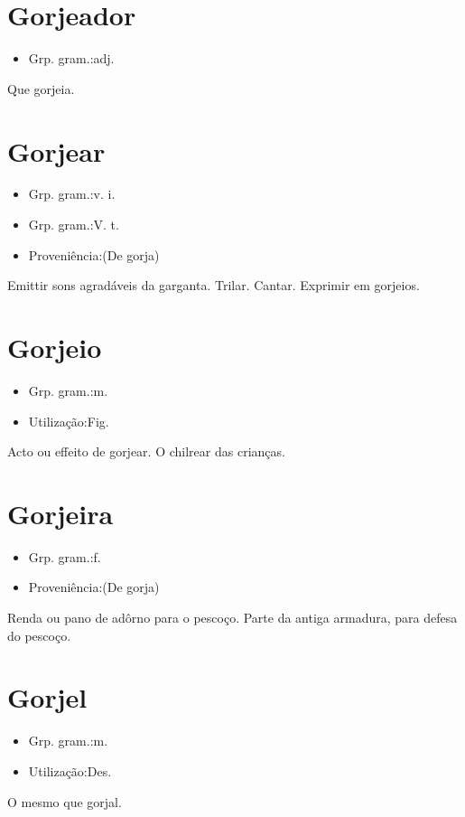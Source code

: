 \section{Gorjeador}
\begin{itemize}
\item {Grp. gram.:adj.}
\end{itemize}
Que gorjeia.
\section{Gorjear}
\begin{itemize}
\item {Grp. gram.:v. i.}
\end{itemize}
\begin{itemize}
\item {Grp. gram.:V. t.}
\end{itemize}
\begin{itemize}
\item {Proveniência:(De \textunderscore gorja\textunderscore )}
\end{itemize}
Emittir sons agradáveis da garganta.
Trilar.
Cantar.
Exprimir em gorjeios.
\section{Gorjeio}
\begin{itemize}
\item {Grp. gram.:m.}
\end{itemize}
\begin{itemize}
\item {Utilização:Fig.}
\end{itemize}
Acto ou effeito de gorjear.
O chilrear das crianças.
\section{Gorjeira}
\begin{itemize}
\item {Grp. gram.:f.}
\end{itemize}
\begin{itemize}
\item {Proveniência:(De \textunderscore gorja\textunderscore )}
\end{itemize}
Renda ou pano de adôrno para o pescoço.
Parte da antiga armadura, para defesa do pescoço.
\section{Gorjel}
\begin{itemize}
\item {Grp. gram.:m.}
\end{itemize}
\begin{itemize}
\item {Utilização:Des.}
\end{itemize}
O mesmo que \textunderscore gorjal\textunderscore .
